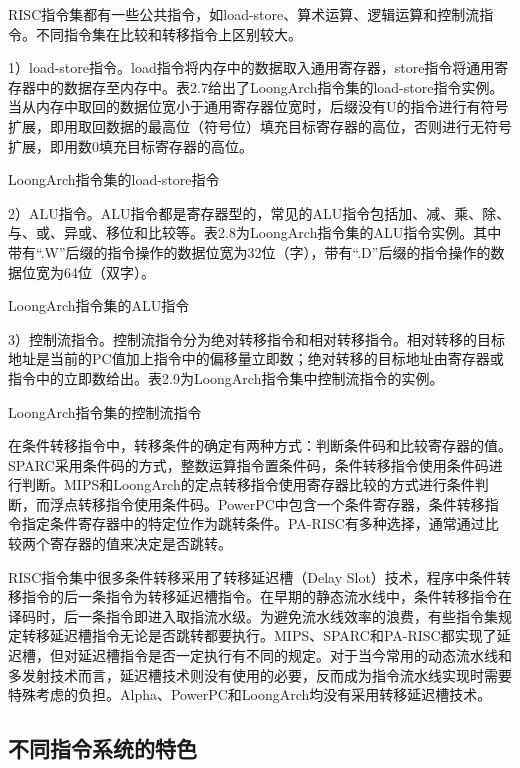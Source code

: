 \documentclass[]{ctexbook}
\begin{document}
RISC指令集都有一些公共指令，如load-store、算术运算、逻辑运算和控制流指令。不同指令集在比较和转移指令上区别较大。

1）load-store指令。load指令将内存中的数据取入通用寄存器，store指令将通用寄存器中的数据存至内存中。表2.7给出了LoongArch指令集的load-store指令实例。当从内存中取回的数据位宽小于通用寄存器位宽时，后缀没有U的指令进行有符号扩展，即用取回数据的最高位（符号位）填充目标寄存器的高位，否则进行无符号扩展，即用数0填充目标寄存器的高位。

\label{tab:mem-inst}LoongArch指令集的load-store指令

2）ALU指令。ALU指令都是寄存器型的，常见的ALU指令包括加、减、乘、除、与、或、异或、移位和比较等。表2.8为LoongArch指令集的ALU指令实例。其中带有``.W''后缀的指令操作的数据位宽为32位（字），带有``.D''后缀的指令操作的数据位宽为64位（双字）。

\label{tab:alu-inst}LoongArch指令集的ALU指令

3）控制流指令。控制流指令分为绝对转移指令和相对转移指令。相对转移的目标地址是当前的PC值加上指令中的偏移量立即数；绝对转移的目标地址由寄存器或指令中的立即数给出。表2.9为LoongArch指令集中控制流指令的实例。

\label{tab:control-inst}LoongArch指令集的控制流指令

在条件转移指令中，转移条件的确定有两种方式：判断条件码和比较寄存器的值。SPARC采用条件码的方式，整数运算指令置条件码，条件转移指令使用条件码进行判断。MIPS和LoongArch的定点转移指令使用寄存器比较的方式进行条件判断，而浮点转移指令使用条件码。PowerPC中包含一个条件寄存器，条件转移指令指定条件寄存器中的特定位作为跳转条件。PA-RISC有多种选择，通常通过比较两个寄存器的值来决定是否跳转。

RISC指令集中很多条件转移采用了转移延迟槽（Delay Slot）技术，程序中条件转移指令的后一条指令为转移延迟槽指令。在早期的静态流水线中，条件转移指令在译码时，后一条指令即进入取指流水级。为避免流水线效率的浪费，有些指令集规定转移延迟槽指令无论是否跳转都要执行。MIPS、SPARC和PA-RISC都实现了延迟槽，但对延迟槽指令是否一定执行有不同的规定。对于当今常用的动态流水线和多发射技术而言，延迟槽技术则没有使用的必要，反而成为指令流水线实现时需要特殊考虑的负担。Alpha、PowerPC和LoongArch均没有采用转移延迟槽技术。

\hypertarget{ux4e0dux540cux6307ux4ee4ux7cfbux7edfux7684ux7279ux8272}{%
\subsection{不同指令系统的特色}\label{ux4e0dux540cux6307ux4ee4ux7cfbux7edfux7684ux7279ux8272}}
\end{document}
